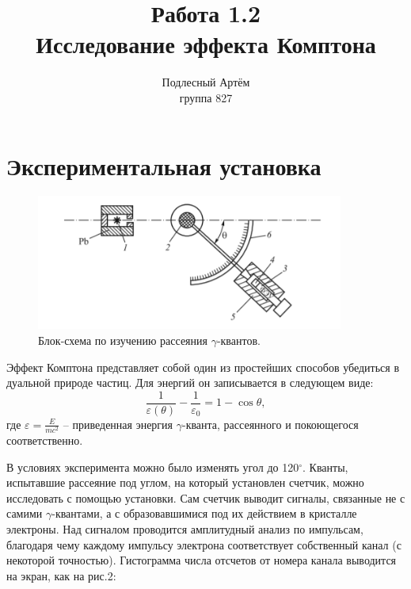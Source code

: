 \documentclass[a4paper, 14pt]{extarticle}%
\author{Подлесный Артём \\ группа 827}
\title{Работа 1.2 \\ Исследование эффекта Комптона}
\newcommand\ECaption[1]{%
     \captionsetup{font=footnotesize}%
     \caption{#1}}
\begin{document}
\maketitle

\section*{Экспериментальная установка}

\begin{figure}[h]
\begin{center}
\includegraphics[width=0.9\textwidth]{ust}
\end{center}
\ECaption{Блок-схема по изучению рассеяния $\gamma$-квантов.}
\end{figure}

Эффект Комптона представляет собой один из простейших способов убедиться в дуальной природе частиц. Для энергий он записывается в следующем виде:
\begin{equation}
\frac{1}{\varepsilon(\theta)}-\frac{1}{\varepsilon_0} = 1-\cos\theta,
\end{equation}
где $\varepsilon = \frac{E}{mc^2}$ -- приведенная энергия $\gamma$-кванта, рассеянного и покоющегося соответственно.

В условиях эксперимента можно было изменять угол до 120$^{\circ}$. Кванты, испытавшие рассеяние под углом, на который установлен счетчик, можно исследовать с помощью установки. Сам счетчик выводит сигналы, связанные не с самими $\gamma$-квантами, а с образовавшимися под их действием в кристалле электроны. Над сигналом проводится амплитудный анализ по импульсам, благодаря чему каждому импульсу электрона соответствует собственный канал (с некоторой точностью). Гистограмма числа отсчетов от номера канала выводится на экран, как на рис.2:
\end{document}

